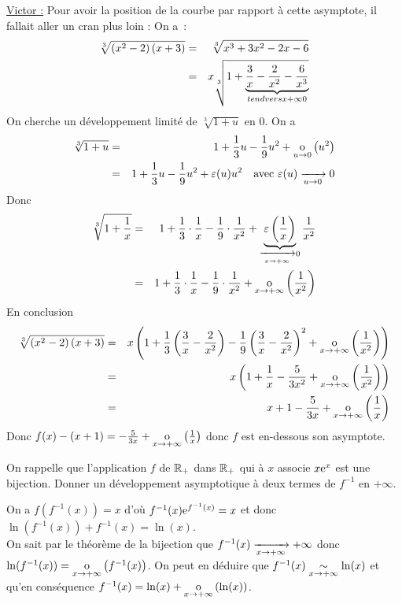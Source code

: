 \documentclass{magnoliaold}
\begin{document}
\begin{exos}
\begin{sol}
\underline{Victor :}
Pour avoir la position de la courbe par rapport à cette asymptote, il fallait aller un cran plus loin :
On a~:
  \begin{eqnarray*}
  \sqrt[3]{\left(x^2-2\right)\left(x+3\right)}
  &=& \sqrt[3]{x^3+3x^2-2x-6}\\
  &=& x\sqrt[3]{1+\underbrace{\frac{3}{x}-\frac{2}{x^2}-\frac{6}{x^3}}_{tendvers{x}{+\infty}0}}
  \end{eqnarray*}
  On cherche un développement limité de
  $\sqrt[3]{1+u}$ en 0.
 On a 
  \begin{eqnarray*}
  \sqrt[3]{1+u}
  &=& 1+\frac{1}{3}u-\frac{1}{9}u^2+\underset{u \rightarrow 0}{\text{o}}\left(u^2\right)\\
  &=& 1+\frac{1}{3}u-\frac{1}{9}u^2+\varepsilon(u)u^2
      \quad \text{avec $\varepsilon(u)\xrightarrow[u\rightarrow 0]{}0$}\\
  \end{eqnarray*}
  Donc
  \begin{eqnarray*}
  \sqrt[3]{1+\frac{1}{x}}
  &=& 1+\frac{1}{3}\cdot\frac{1}{x}-\frac{1}{9}\cdot \frac{1}{x^2}+
      \underbrace{\varepsilon\left(\frac{1}{x}\right)}_{\xrightarrow[x\rightarrow +\infty]{}0}
      \frac{1}{x^2}\\
  &=& 1+\frac{1}{3}\cdot\frac{1}{x}-\frac{1}{9}\cdot \frac{1}{x^2}+\underset{x \rightarrow +\infty}{\text{o}}\left(\frac{1}{x^2}\right)
  \end{eqnarray*}
  En conclusion
  \begin{eqnarray*}
  \sqrt[3]{\left(x^2-2\right)\left(x+3\right)}
  &=& x\left(1+\frac{1}{3}\left(\frac{3}{x}-\frac{2}{x^2}\right)-\frac{1}{9}\left(\frac{3}{x}-\frac{2}{x^2}\right)^2+\underset{x \rightarrow +\infty}{\text{o}}\left(\frac{1}{x^2}\right)\right)\\
  &=& x\left(1+\frac{1}{x}-\frac{5}{3x^2}+\underset{x \rightarrow +\infty}{\text{o}}\left(\frac{1}{x^2}\right)\right)\\
  &=& x+1-\frac{5}{3x}+\underset{x \rightarrow +\infty}{\text{o}}\left(\frac{1}{x}\right)
  \end{eqnarray*}
  Donc $f(x)-(x+1)=-\frac{5}{3x}+\underset{x \rightarrow +\infty}{\text{o}}\left(\frac{1}{x}\right)$ donc $f$ est en-dessous son asymptote.
  \end{sol}
\exo 
  On rappelle que l'application $f$ de $\mathbb{R}_+$ dans $\mathbb{R}_+$ qui à $x$ associe
  $x{\rm e}^x$ est une bijection. Donner un développement asymptotique à deux termes
  de $f^{-1}$ en $+\infty$.
  \begin{sol}
  On a $f(f^{-1}(x))=x$ d'où $f^{-1}(x){\rm e}^{f^{-1}(x)}=x$ et donc $\ln(f^{-1}(x))+f^{-1}(x)=\ln(x)$.\\
  On sait par le théorème de la bijection que $f^{-1}(x)\xrightarrow[x\rightarrow +\infty]{}+\infty$ donc $\ln(f^{-1}(x))=\underset{x \rightarrow +\infty}{\text{o}}\left(f^{-1}(x)\right)$. On peut en déduire que $f^{-1}(x)\underset{x\rightarrow +\infty}{\sim}\ln(x)$ et qu'en conséquence $f^{-1}(x)=\ln(x)+\underset{x \rightarrow +\infty}{\text{o}}\left(\ln(x)\right)$.
  

\end{sol}
\end{exos}
\end{document}
